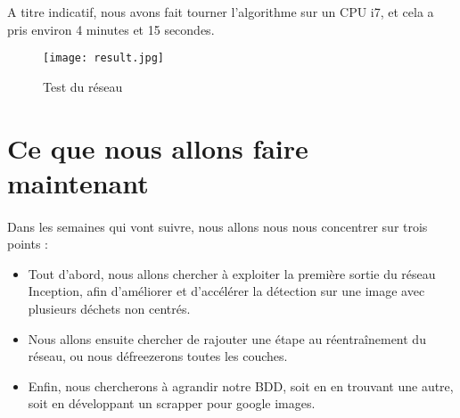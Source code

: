 \documentclass[11pt,a4paper,twocolumn]{article}
\begin{document}
A titre indicatif, nous avons fait tourner l’algorithme sur un CPU i7, et cela a pris environ 4 minutes et 15 secondes.

\begin{figure}[H]
	\center
	\texttt{[image: result.jpg]}
	\caption{Test du réseau}
	\label{result}
\end{figure}



\section{Ce que nous allons faire maintenant}

\paragraph*{}

Dans les semaines qui vont suivre, nous allons nous nous concentrer sur trois points :
\begin{itemize}
  \item Tout d’abord, nous allons chercher à exploiter la première sortie du réseau Inception, afin d’améliorer et d’accélérer la détection sur une image avec plusieurs déchets non centrés.
  \item Nous allons ensuite chercher de rajouter une étape au réentraînement du réseau, ou nous défreezerons toutes les couches.
  \item Enfin, nous chercherons à agrandir notre BDD, soit en en trouvant une autre, soit en développant un scrapper pour google images.
\end{itemize}
\end{document}
